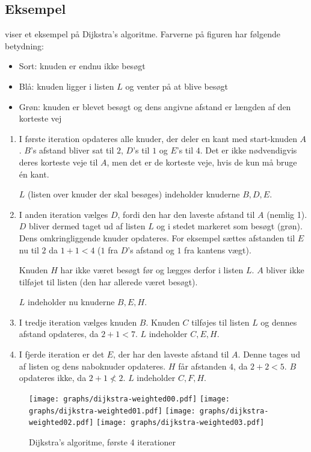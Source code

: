 \documentclass[10pt,a4paper,danish]{article}
\begin{document}
\subsection{Eksempel}
 viser et eksempel på Dijkstra's
algoritme. Farverne på figuren har følgende betydning:
\begin{itemize}
\item Sort: knuden er endnu ikke besøgt
\item Blå: knuden ligger i listen $L$ og venter på at blive besøgt
\item Grøn: knuden er blevet besøgt og dens angivne afstand er længden af
  den korteste vej
\end{itemize}

\begin{enumerate}
\item I første iteration opdateres alle knuder, der deler en kant med
  start-knuden $A$. $B$'s afstand bliver sat til $2$, $D$'s til $1$ og
  $E$'s til $4$. Det er ikke nødvendigvis deres korteste veje til $A$,
  men det er de korteste veje, hvis de kun må bruge \'en kant.

  $L$ (listen over knuder der skal besøges) indeholder knuderne
  $B,D,E$.

\item I anden iteration vælges $D$, fordi den har den laveste afstand
  til $A$ (nemlig 1). $D$ bliver dermed taget ud af listen $L$ og i
  stedet markeret som besøgt (grøn). Dens omkringliggende knuder
  opdateres. For eksempel sættes afstanden til $E$ nu til $2$ da $1+1
  < 4$ ($1$ fra $D$'s afstand og $1$ fra kantens vægt).

  Knuden $H$ har ikke været besøgt før og lægges derfor i listen
  $L$. $A$ bliver ikke tilføjet til listen (den har allerede været besøgt).

  $L$ indeholder nu knuderne $B,E,H$.

\item I tredje iteration vælges knuden $B$. Knuden $C$ tilføjes til
  listen $L$ og dennes afstand opdateres, da $2+1 < 7$. $L$ indeholder
  $C,E,H$.

\item I fjerde iteration er det $E$, der har den laveste afstand til
  $A$. Denne tages ud af listen og dens naboknuder opdateres. $H$ får
  afstanden $4$, da $2+2<5$. $B$ opdateres ikke, da $2+1\not< 2$. $L$
  indeholder $C,F,H$.
\end{enumerate}


\begin{figure}[h]\centering
\texttt{[image: graphs/dijkstra-weighted00.pdf]}
\texttt{[image: graphs/dijkstra-weighted01.pdf]}
\texttt{[image: graphs/dijkstra-weighted02.pdf]}
\texttt{[image: graphs/dijkstra-weighted03.pdf]}
\caption{Dijkstra's algoritme, første 4 iterationer}
\label{fig:dijkstraw0}
\end{figure}
\end{document}
